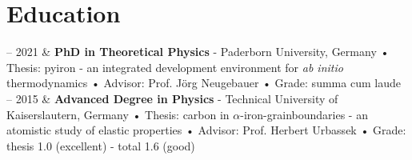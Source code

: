 \documentclass[11pt, a4paper]{article}
\newcommand{\TUKL}{Technical University of Kaiserslautern}
\newcommand{\Duration}[2]{\fontsize{10pt}{0}\selectfont #1 -- #2}
\begin{document}
\section{Education}

\begin{EntriesTable}
  \Duration{2015}{2021}  &
  \textbf{PhD in Theoretical Physics} - Paderborn University, Germany \newline
   • Thesis: pyiron - an integrated development environment for \textit{ab initio} thermodynamics \newline
   • Advisor: Prof. J\"org Neugebauer\newline
   • Grade: summa cum laude
  \\
  \Duration{2009}{2015}  &
  \textbf{Advanced Degree in Physics} - \TUKL, Germany \newline
   • Thesis: carbon in $\alpha$-iron-grainboundaries - an atomistic study of elastic properties\newline
   • Advisor: Prof. Herbert Urbassek\newline
   • Grade: thesis 1.0 (excellent) - total 1.6 (good)
\end{EntriesTable}
\newpage
\end{document}

